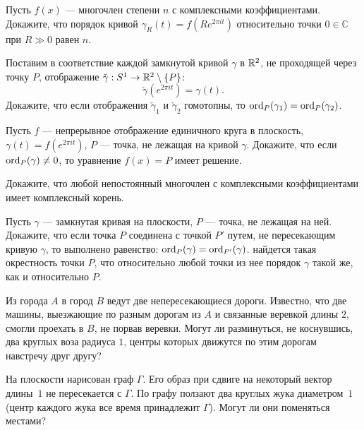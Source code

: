 \documentclass[a4paper,12pt]{article}
\newcommand{\0}[1]{\overline{#1}}
\renewcommand{\C}{\mathbb{C}}
\begin{document}
Пусть $f(x)$ --- многочлен степени $n$  с комплексными коэффициентами.
Докажите, что порядок кривой $\gamma_R(t)=f(Re^{2\pi it})$ относительно
точки $0\in\C$ при $R\gg0$ равен $n$.

Поставим в соответствие каждой замкнутой кривой $\gamma$ в $\mathbb{R}^2$, не
проходящей через точку $P$, отображение $\check\gamma:S^1\rightarrow
\mathbb{R}^2\setminus\{P\}$:
\vspace{-3mm}
$$
\check\gamma(e^{2\pi it})=\gamma(t).
$$
Докажите, что если отображения $\check\gamma_1$ и $\check\gamma_2$
гомотопны, то $\operatorname{ord}_P(\gamma_1)=\operatorname{ord}_P(\gamma_2)$.

Пусть $f$ --- непрерывное отображение единичного круга в
плоскость,
$\gamma(t)=f(e^{2\pi it})$, $P$ --- точка, не лежащая
на кривой $\gamma$. Докажите, что если $\operatorname{ord}_P(\gamma)\ne0$, то
уравнение $f(x)=P$ имеет решение.  

Докажите, что любой непостоянный многочлен с комплексными коэффициентами
имеет комплексный корень.

Пусть $\gamma$ --- замкнутая кривая на плоскости, $P$ --- точка, не
лежащая на ней. Докажите, что
если точка $P$ соединена с точкой $P'$ путем, не пересекающим кривую
$\gamma$, то выполнено равенство:
$\operatorname{ord}_P(\gamma)=\operatorname{ord}_{P'}(\gamma)$.
найдется такая окрестность точки $P$, что относительно любой точки из
нее порядок $\gamma$ такой же, как и относительно $P$.

Из города $A$ в город $B$ ведут две непересекающиеся дороги. Известно,
что две машины, выезжающие по разным дорогам из $A$ и связанные
веревкой длины $2$, смогли проехать в $B$, не порвав веревки. Могут ли
разминуться, не коснувшись, два круглых воза радиуса $1$, центры которых
движутся по этим дорогам навстречу друг другу?

На плоскости нарисован граф $\Gamma$. Его образ при сдвиге на некоторый
вектор длины~$1$ не пересекается с $\Gamma$. По графу ползают два
круглых жука диаметром~$1$ (центр каждого жука все время принадлежит
$\Gamma$).  Могут ли они поменяться местами?

\vfill
{}
\end{document}
